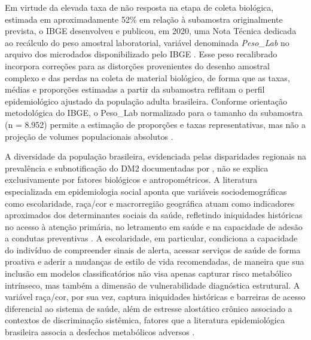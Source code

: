 Em virtude da elevada taxa de não resposta na etapa de coleta biológica, estimada em aproximadamente 52\% em relação à subamostra originalmente prevista, o IBGE desenvolveu e publicou, em 2020, uma Nota Técnica \cite{IBGE} dedicada ao recálculo do peso amostral laboratorial, variável denominada \textit{Peso\_Lab} no arquivo dos microdados disponibilizado pelo IBGE \cite{IBGE_PNS2013_Exames}. Esse peso recalibrado incorpora correções para as distorções provenientes do desenho amostral complexo e das perdas na coleta de material biológico, de forma que as taxas, médias e proporções estimadas a partir da subamostra reflitam o perfil epidemiológico ajustado da população adulta brasileira. Conforme orientação metodológica do IBGE, o Peso\_Lab normalizado para o tamanho da subamostra (n = 8.952) permite a estimação de proporções e taxas representativas, mas não a projeção de volumes populacionais absolutos \cite{IBGE_PNS2013_Exames}.

A diversidade da população brasileira, evidenciada pelas disparidades regionais na prevalência e subnotificação do DM2 documentadas por \textcite{muzy2021prevalencia, iser2015prevalencia, reis2022evolution}, não se explica exclusivamente por fatores biológicos e antropométricos. A literatura especializada em epidemiologia social aponta que variáveis sociodemográficas como escolaridade, raça/cor e macrorregião geográfica atuam como indicadores aproximados dos determinantes sociais da saúde, refletindo iniquidades históricas no acesso à atenção primária, no letramento em saúde e na capacidade de adesão a condutas preventivas \cite{deAlmeida-Pititto09112015}. A escolaridade, em particular, condiciona a capacidade do indivíduo de compreender sinais de alerta, acessar serviços de saúde de forma proativa e aderir a mudanças de estilo de vida recomendadas, de maneira que sua inclusão em modelos classificatórios não visa apenas capturar risco metabólico intrínseco, mas também a dimensão de vulnerabilidade diagnóstica estrutural. A variável raça/cor, por sua vez, captura iniquidades históricas e barreiras de acesso diferencial ao sistema de saúde, além de estresse alostático crônico associado a contextos de discriminação sistêmica, fatores que a literatura epidemiológica brasileira associa a desfechos metabólicos adversos \cite{deAlmeida-Pititto09112015, muzy2021prevalencia}.

